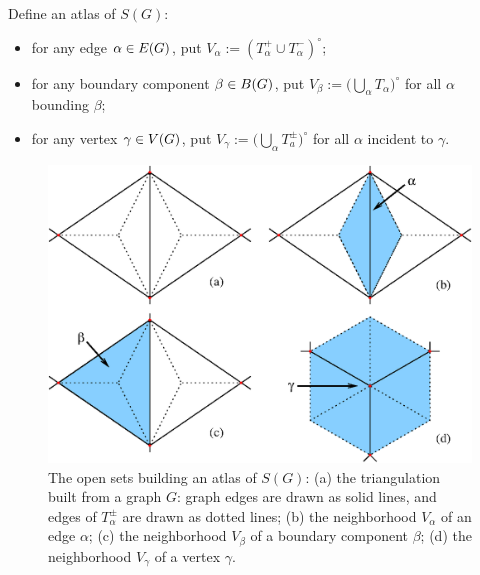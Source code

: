 Define an atlas of $S(G)$:
\begin{itemize}
\item for any edge $\alpha \in E(G)$, put $V_\alpha := (T_\alpha^+ \cup T_\alpha^-)^\circ$;
\item for any boundary component $\beta \in B(G)$, put $V_\beta := \bigl(
  \bigcup_{\alpha} T_\alpha \bigr)^\circ$ for all $\alpha$ bounding $\beta$;
\item for any vertex $\gamma \in V(G)$, put $V_\gamma := \bigl( \bigcup_\alpha T_a^\pm
  \bigr)^\circ$ for all $\alpha$ incident to $\gamma$.
\end{itemize}
\begin{figure}[btp]
  \centering\includegraphics[width=\textwidth]{atlas}
  \caption{The open sets building an atlas of $S(G)$: (a) the
    triangulation built from a graph $G$: graph edges are drawn as
    solid lines, and edges of $T_\alpha^{\pm}$ are drawn as dotted lines; (b)
    the neighborhood $V_\alpha$ of an edge $\alpha$; (c) the neighborhood $V_\beta$
    of a boundary component $\beta$; (d) the neighborhood $V_\gamma$ of a
    vertex $\gamma$.}
  \label{fig:atlas}
\end{figure}

